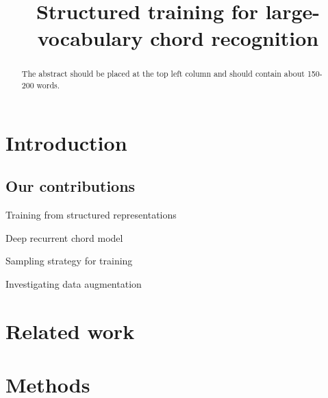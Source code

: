 \documentclass{article}
\title{Structured training for large-vocabulary chord recognition}
\begin{document}
%
\maketitle
%
\begin{abstract}
The abstract should be placed at the top left column and should contain about 150-200 words.
\end{abstract}
%
\section{Introduction}\label{sec:introduction}





\subsection{Our contributions}

Training from structured representations

Deep recurrent chord model

Sampling strategy for training

Investigating data augmentation

%
\section{Related work}

\cite{korzeniowski2016feature} %

\cite{cho2014improved} %

\cite{humphrey2015four}


\cite{ni2012end} %


\section{Methods}

\end{document}
